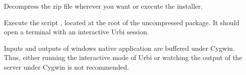 Decompress the zip file wherever you want or execute the installer.

Execute the script , located at the root of the
uncompressed package. It should open a terminal with an interactive
Urbi session.

\begin{cygwin}
Inputs and outputs of windows native application are buffered under Cygwin.
Thus, either running the interactive mode of Urbi or watching the output of the
server under Cygwin is not recommended.
\end{cygwin}



